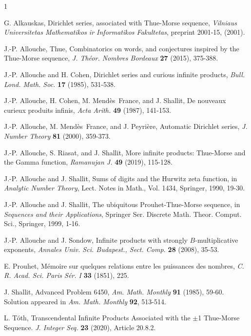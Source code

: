\documentclass[12pt,reqno]{article}
\begin{document}
\begin{thebibliography}{1}\footnotesize
	
	
	G. Alkauskas, Dirichlet series, associated with Thue-Morse sequence, \emph{Vilniaus Universitetas Mathematikos ir Informatikos Fakultetas}, preprint 2001-15, (2001).
	
	J.-P. Allouche, Thue, Combinatorics on words, and conjectures inspired by the Thue-Morse sequence, \emph{J. Th\'eor. Nombres Bordeaux} \textbf{27} (2015), 375-388.
	
	J.-P. Allouche and H. Cohen, Dirichlet series and curious infinite products, \emph{Bull. Lond. Math. Soc.} \textbf{17} (1985), 531-538.
	
	J.-P. Allouche, H. Cohen, M. Mend\`es~France, and J. Shallit, De nouveaux curieux produits infinis, \emph{Acta Arith.} \textbf{49} (1987), 141-153.
	
	J.-P. Allouche, M. Mend\`es~France, and J. Peyri\`ere, Automatic Dirichlet series, \emph{J. Number Theory} \textbf{81} (2000), 359-373.
	
	J.-P. Allouche, S. Riasat, and J. Shallit, More infinite products: Thue-Morse and the Gamma function, \emph{Ramanujan J.} \textbf{49} (2019), 115-128.
	
	J.-P. Allouche and J. Shallit, Sums of digits and the Hurwitz zeta function, in \textit{Analytic Number Theory}, Lect. Notes in Math., Vol. 1434, Springer, 1990, 19-30.
	
	J.-P. Allouche and J. Shallit, The ubiquitous Prouhet-Thue-Morse sequence, in \textit{Sequences
		and their Applications}, Springer Ser. Discrete Math. Theor. Comput. Sci., Springer, 1999, 1-16.
	
	J.-P. Allouche and J. Sondow, Infinite products with strongly $B$-multiplicative exponents, \emph{Annales Univ. Sci. Budapest., Sect. Comp.} \textbf{28} (2008), 35-53.
	
	E. Prouhet, M\'emoire sur quelques relations entre les puissances des nombres, \textit{C. R. Acad. Sci. Paris S\'er. I} \textbf{33} (1851), 225.
	
	J. Shallit, Advanced Problem 6450, \textit{Am. Math. Monthly} \textbf{91} (1985), 59-60. Solution appeared in \textit{Am. Math. Monthly} \textbf{92}, 513-514.
	
	L. T\'oth, Transcendental Infinite Products Associated
	with the $\pm$1 Thue-Morse Sequence. \textit{J. Integer Seq.} \textbf{23} (2020), Article 20.8.2.
\end{thebibliography}
\end{document}
